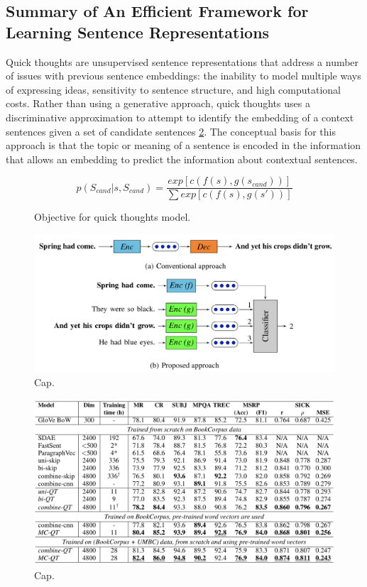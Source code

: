 \subsection{Summary of An Efficient Framework for Learning Sentence Representations}

Quick thoughts  \cite{logeswaran2018an} are unsupervised sentence representations that address a number of issues with previous sentence embeddings: the inability to model multiple ways of expressing ideas, sensitivity to sentence structure, and high computational costs. Rather than using a generative approach, quick thoughts uses a discriminative approximation to attempt to identify the embedding of a context sentences given a set of candidate sentences \ref{fig:quickthoughts-1}. The conceptual basis for this approach is that the topic or meaning of a sentence is encoded in the information that allows an embedding to predict the information about contextual sentences. 

\begin{figure}[h!]
    \centering
    $$
    p(S_{cand}|s, S_{cand}) = \frac{exp[c(f(s),g(s_{cand}))]}{\sum exp[c(f(s),g(s'))]}
    $$
    \caption{Objective for quick thoughts model.}
    \label{fig:quickthoughts-obj}
\end{figure}


\begin{figure}[h!]
\centering
  \includegraphics[width=.5\linewidth]{files/quickthoughts-1.png}
  \caption{Cap.}
  \label{fig:quickthoughts-1}
\end{figure}

\begin{figure}
\centering
  \includegraphics[width=.5\linewidth]{files/quickthoughts-2.png}
  \caption{Cap.}
  \label{fig:vae}
\end{figure}

